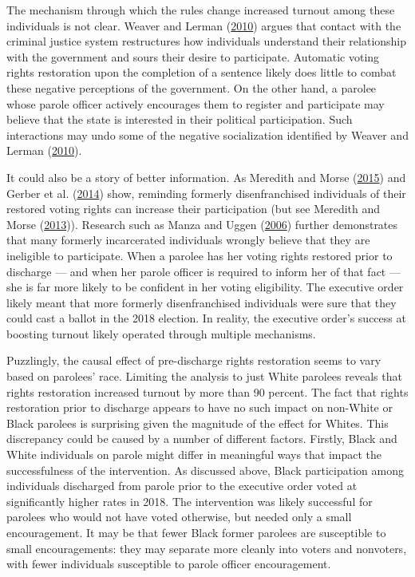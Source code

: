 \documentclass[
  12pt,
]{article}
\begin{document}
The mechanism through which the rules change increased turnout among these individuals is not clear. Weaver and Lerman (\protect\hyperlink{ref-Weaver2010}{2010}) argues that contact with the criminal justice system restructures how individuals understand their relationship with the government and sours their desire to participate. Automatic voting rights restoration upon the completion of a sentence likely does little to combat these negative perceptions of the government. On the other hand, a parolee whose parole officer actively encourages them to register and participate may believe that the state is interested in their political participation. Such interactions may undo some of the negative socialization identified by Weaver and Lerman (\protect\hyperlink{ref-Weaver2010}{2010}).

It could also be a story of better information. As Meredith and Morse (\protect\hyperlink{ref-Meredith2015}{2015}) and Gerber et al. (\protect\hyperlink{ref-Gerber2014}{2014}) show, reminding formerly disenfranchised individuals of their restored voting rights can increase their participation (but see Meredith and Morse (\protect\hyperlink{ref-Meredith2013}{2013})). Research such as Manza and Uggen (\protect\hyperlink{ref-locked_out}{2006}) further demonstrates that many formerly incarcerated individuals wrongly believe that they are ineligible to participate. When a parolee has her voting rights restored prior to discharge --- and when her parole officer is required to inform her of that fact --- she is far more likely to be confident in her voting eligibility. The executive order likely meant that more formerly disenfranchised individuals were sure that they could cast a ballot in the 2018 election. In reality, the executive order's success at boosting turnout likely operated through multiple mechanisms.

Puzzlingly, the causal effect of pre-discharge rights restoration seems to vary based on parolees' race. Limiting the analysis to just White parolees reveals that rights restoration increased turnout by more than 90 percent. The fact that rights restoration prior to discharge appears to have no such impact on non-White or Black parolees is surprising given the magnitude of the effect for Whites. This discrepancy could be caused by a number of different factors. Firstly, Black and White individuals on parole might differ in meaningful ways that impact the successfulness of the intervention. As discussed above, Black participation among individuals discharged from parole prior to the executive order voted at significantly higher rates in 2018. The intervention was likely successful for parolees who would not have voted otherwise, but needed only a small encouragement. It may be that fewer Black former parolees are susceptible to small encouragements: they may separate more cleanly into voters and nonvoters, with fewer individuals susceptible to parole officer encouragement.
\end{document}
